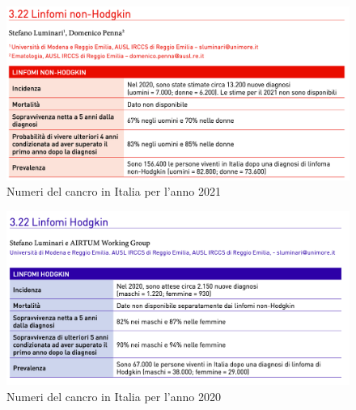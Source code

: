 \begin{figure}[H]
    \begin{center}
    \includegraphics[width=0.8\columnwidth]{img/2021.png}
    \vspace{-3mm}
    \end{center}
    \caption{Numeri del cancro in Italia per l’anno 2021
    \cite{img4-6-7}}
    \label{fig:FIGURE_2.2}
\end{figure}

\begin{figure}[H]
    \begin{center}
    \includegraphics[width=0.8\columnwidth]{img/2020.png}
    \vspace{-3mm}
    \end{center}
    \caption{Numeri del cancro in Italia per l’anno 2020
    \cite{img5}}

\end{figure}

